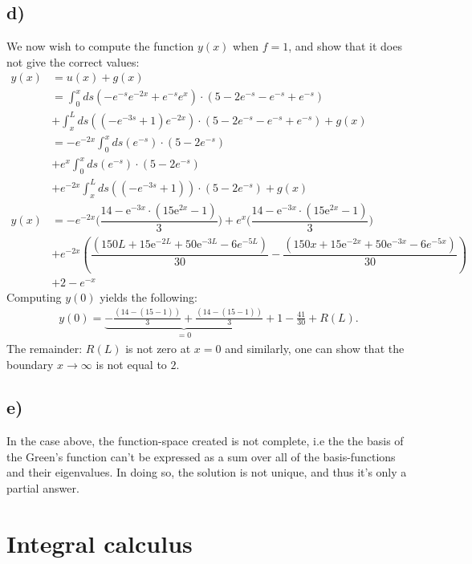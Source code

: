 \documentclass{article}
\begin{document}
\subsection*{d)}
We now wish to compute the function $y(x)$ when $f = 1$, and show that it does not give the correct values:
\begin{align*}
  y(x) &= u(x) + g(x)\\
    &= \int_0^x ds\left(-e^{-s}e^{-2x} + e^{-s}e^{x}\right)\cdot\left(5-2e^{-s} -e^{-s} + e^{-s}\right)\\
    &+ \int_x^L ds\left((-e^{-3s} + 1)e^{-2x}\right)\cdot\left(5-2e^{-s} -e^{-s} + e^{-s} \right) +g(x)\\
    &= -e^{-2x}\int_0^x ds\left(e^{-s} \right)\cdot\left(5-2e^{-s} \right)\\
    &+ e^{x}\int_0^x ds\left( e^{-s}\right)\cdot\left(5-2e^{-s} \right)\\
    &+ e^{-2x}\int_x^L ds\left((-e^{-3s} + 1)\right)\cdot\left(5-2e^{-s} \right) +g(x)\\
    y(x) &= -e^{-2x}\Big(\dfrac{14 -  \mathrm{e}^{-3x}\cdot\left(15\mathrm{e}^{2x}-1\right)}{3} \Big) + e^{x}\Big(\dfrac{14 -  \mathrm{e}^{-3x}\cdot\left(15\mathrm{e}^{2x}-1\right)}{3} \Big)\\
    &+e^{-2x}\left(\dfrac{\left(150L+15\mathrm{e}^{-2L}+50\mathrm{e}^{-3L}-6e^{-5L}\right)}{30}-\dfrac{\left(150x+15\mathrm{e}^{-2x}+50\mathrm{e}^{-3x}-6e^{-5x}\right)}{30}\right)\\
    & + 2 - e^{-x}
\end{align*}
Computing $y(0)$ yields the following:
\begin{align*}
    y(0) = \underbrace{-\frac{\left(14 - (15-1)\right)}{3} + \frac{\left(14 - (15-1)\right)}{3}}_{=0} + 1 -\frac{41}{30} + R(L). 
\end{align*}The remainder: $R(L)$ is not zero at $x = 0$ and similarly, one can show that the boundary $x\to\infty$ is not equal to $2$.

\subsection*{e)}
In the case above, the function-space created is not complete, i.e the the basis of the Green's function can't be expressed as a sum over all of the basis-functions and their eigenvalues. In doing so, the solution is not unique,
and thus it's only a partial answer.

\section{Integral calculus}
\end{document}
